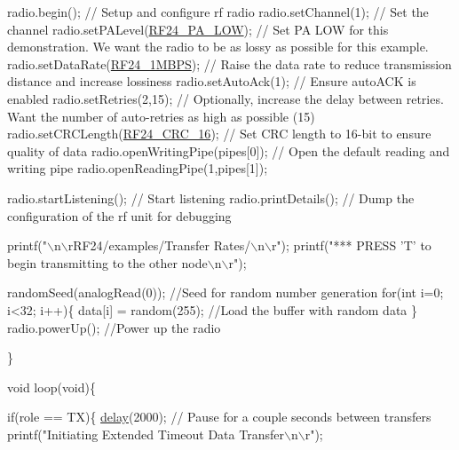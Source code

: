 \begin{DoxyCodeInclude}
  radio.begin();                           \textcolor{comment}{// Setup and configure rf radio}
  radio.setChannel(1);                     \textcolor{comment}{// Set the channel}
  radio.setPALevel(\hyperlink{RF24_8h_a1e4cd0bea93e6b43422855fb0120aacea7d8d09f4a047b7c22655e56c98ca010c}{RF24\_PA\_LOW});           \textcolor{comment}{// Set PA LOW for this demonstration. We want the
       radio to be as lossy as possible for this example.}
  radio.setDataRate(\hyperlink{RF24_8h_a82745de4aa1251b7561564b3ed1d6522afd01f3fd55247a67c0bcfd459fe17fdf}{RF24\_1MBPS});           \textcolor{comment}{// Raise the data rate to reduce transmission distance
       and increase lossiness}
  radio.setAutoAck(1);                     \textcolor{comment}{// Ensure autoACK is enabled}
  radio.setRetries(2,15);                  \textcolor{comment}{// Optionally, increase the delay between retries. Want the
       number of auto-retries as high as possible (15)}
  radio.setCRCLength(\hyperlink{RF24_8h_adbe00719f3f835c82bd007081d040a7ea6eeb0379e23be63559106d96ada47a56}{RF24\_CRC\_16});         \textcolor{comment}{// Set CRC length to 16-bit to ensure quality of data}
  radio.openWritingPipe(pipes[0]);         \textcolor{comment}{// Open the default reading and writing pipe}
  radio.openReadingPipe(1,pipes[1]);       
  
  radio.startListening();                 \textcolor{comment}{// Start listening}
  radio.printDetails();                   \textcolor{comment}{// Dump the configuration of the rf unit for debugging}
  
  printf(\textcolor{stringliteral}{"\(\backslash\)n\(\backslash\)rRF24/examples/Transfer Rates/\(\backslash\)n\(\backslash\)r"});
  printf(\textcolor{stringliteral}{"*** PRESS 'T' to begin transmitting to the other node\(\backslash\)n\(\backslash\)r"});
  
  randomSeed(analogRead(0));              \textcolor{comment}{//Seed for random number generation  }
  \textcolor{keywordflow}{for}(\textcolor{keywordtype}{int} i=0; i<32; i++)\{
     data[i] = random(255);               \textcolor{comment}{//Load the buffer with random data}
  \}
  radio.powerUp();                        \textcolor{comment}{//Power up the radio}

  
\}



\textcolor{keywordtype}{void} loop(\textcolor{keywordtype}{void})\{


  \textcolor{keywordflow}{if}(role == TX)\{    
    \hyperlink{group__Porting__General_ga70a331e8ddf9acf9d33c47b71cda4c5f}{delay}(2000);                                              \textcolor{comment}{// Pause for a couple seconds between
       transfers    }
    printf(\textcolor{stringliteral}{"Initiating Extended Timeout Data Transfer\(\backslash\)n\(\backslash\)r"});


\end{DoxyCodeInclude}
